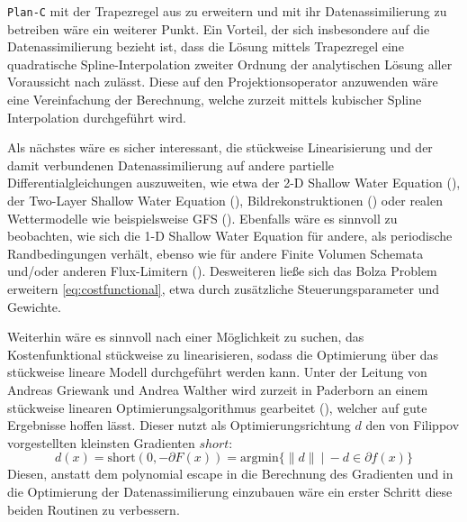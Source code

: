 \texttt{Plan-C} mit der Trapezregel aus \cite[S.23 (15)]{monster} zu erweitern und mit ihr Datenassimilierung zu betreiben wäre ein weiterer Punkt.
Ein Vorteil, der sich insbesondere auf die Datenassimilierung bezieht ist, dass die Lösung mittels Trapezregel eine quadratische Spline-Interpolation zweiter Ordnung der analytischen Lösung aller Voraussicht nach zulässt. Diese auf den Projektionsoperator anzuwenden wäre eine Vereinfachung der Berechnung, welche zurzeit mittels kubischer Spline Interpolation durchgeführt wird.

Als nächstes wäre es sicher interessant, die stückweise Linearisierung und der damit verbundenen Datenassimilierung auf andere partielle Differentialgleichungen auszuweiten, wie etwa der 2-D Shallow Water Equation (\cite[\S 3]{kurganov2007second}), der Two-Layer Shallow Water Equation (\cite{kurganov2009central}), Bildrekonstruktionen (\cite{korotaev2008retrieving}) oder realen Wettermodelle wie beispielsweise GFS (\cite{gfs}). 
Ebenfalls wäre es sinnvoll zu beobachten, wie sich die 1-D Shallow Water Equation für andere, als periodische Randbedingungen verhält, ebenso wie für andere Finite Volumen Schemata und/oder anderen Flux-Limitern (\cite{juntasaro2004comparative}).
Desweiteren ließe sich das Bolza Problem erweitern \eqref{eq:costfunctional}, etwa durch zusätzliche Steuerungsparameter und Gewichte. 

Weiterhin wäre es sinnvoll nach einer Möglichkeit zu suchen, das Kostenfunktional stückweise zu linearisieren, sodass die Optimierung über das stückweise lineare Modell durchgeführt werden kann.
Unter der Leitung von Andreas Griewank und Andrea Walther wird zurzeit in Paderborn an einem stückweise linearen Optimierungsalgorithmus gearbeitet (\cite{griewank2014lipschitz}), welcher auf gute Ergebnisse hoffen lässt. 
Dieser nutzt als Optimierungsrichtung $d$ den von Filippov vorgestellten kleinsten Gradienten $short$:
\[
d(x) = \text{short}(0,-\partial F(x)) = \text{argmin} \lbrace \|d\| ~|~ -d \in \partial f(x) \rbrace
\]
Diesen, anstatt dem polynomial escape in die Berechnung des Gradienten und in die Optimierung der Datenassimilierung einzubauen wäre ein erster Schritt diese beiden Routinen zu verbessern.
